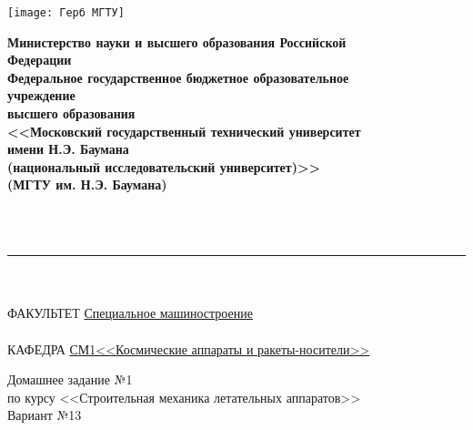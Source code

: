 \begin{minipage}{0.2\linewidth}
    \texttt{[image: Герб МГТУ]}
\end{minipage}
\begin{minipage}{0.8\linewidth}
    \begin{center}
        \begin{singlespace}
            \textbf{Министерство науки и высшего образования Российской \\ Федерации \\ Федеральное государственное бюджетное образовательное \\ учреждение \\ высшего образования \\ <<Московский государственный технический университет \\ имени Н.Э. Баумана \\ (национальный исследовательский университет)>> \\ (МГТУ им. Н.Э. Баумана)}
        \end{singlespace}
    \end{center}
\end{minipage}
\\
\\
\rule{\linewidth}{2pt} %
\\
\\
ФАКУЛЬТЕТ \underline{\hspace{0.25\linewidth} Специальное машиностроение \hspace{0.25\linewidth}}
\\
\\
КАФЕДРА \underline{\hspace{0.16\linewidth} СМ1<<Космические аппараты и ракеты-носители>> \hspace{0.16\linewidth}}
\\
\vspace{1.5cm}
\begin{center}
    \begin{minipage}{0.8\linewidth}
        \begin{center}
            \large Домашнее задание №1 \\ по курсу <<Строительная механика летательных аппаратов>>
            \\[10pt]
            \large Вариант №13
        \end{center}
    \end{minipage}
\end{center}
